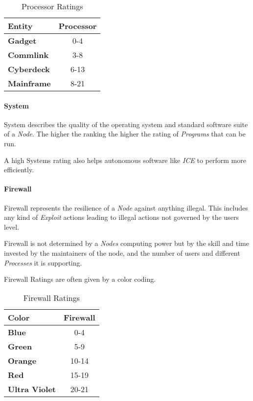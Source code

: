 \begin{table}[htb]
    \caption[Processor Ratings]{Processor Ratings}
    \label{tab:processor ratings}
    \centering
    \begin{tabular}{lc}
        \toprule
        \textbf{Entity}    & \textbf{Processor} \\
        \midrule
        \textbf{Gadget}    & 0-4                \\
        \textbf{Commlink}  & 3-8                \\
        \textbf{Cyberdeck} & 6-13               \\
        \textbf{Mainframe} & 8-21               \\
        \bottomrule
    \end{tabular}
\end{table}


\paragraph{System}

System describes the quality of the operating system and standard software
suite of a \emph{Node}. The higher the ranking the higher the rating of
\emph{Programs} that can be run.

A high Systems rating also helps autonomous software like \emph{ICE} to
perform more efficiently.

\paragraph{Firewall}

Firewall represents the resilience of a \emph{Node} against anything
illegal. This includes any kind of \emph{Exploit} actions leading to
illegal actions not governed by the users level.

Firewall is not determined by a \emph{Nodes} computing power but by
the skill and time invested by the maintainers of the node, and the
number of users and different \emph{Processes} it is supporting.

\hfill

Firewall Ratings are often given by a color coding.

\begin{table}[htb]
    \caption[Firewall Ratings]{Firewall Ratings}
    \label{tab:firwall ratings}
    \centering
    \begin{tabular}{lc}
        \toprule
        \textbf{Color}        & \textbf{Firewall} \\
        \midrule
        \textbf{Blue}         & 0-4               \\
        \textbf{Green}        & 5-9               \\
        \textbf{Orange}       & 10-14             \\
        \textbf{Red}          & 15-19             \\
        \textbf{Ultra Violet} & 20-21             \\
        \bottomrule
    \end{tabular}
\end{table}

